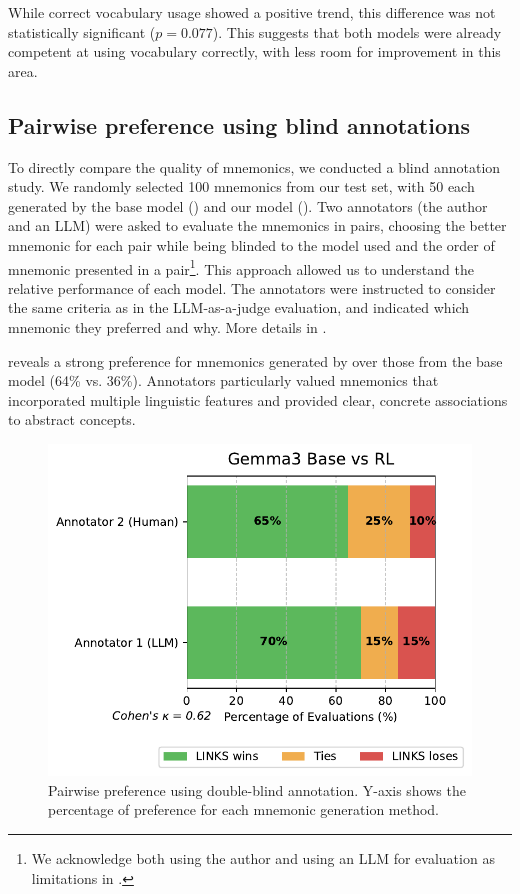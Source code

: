 While correct vocabulary usage showed a positive trend, this difference was not statistically significant ($p = 0.077$). This suggests that both models were already competent at using vocabulary correctly, with less room for improvement in this area.

\subsection{Pairwise preference using blind annotations} \label{sec:pairwise-preference}

To directly compare the quality of mnemonics, we conducted a blind annotation study. We randomly selected 100 mnemonics from our test set, with 50 each generated by the base model (\studentmodel) and our model (\linksys). Two annotators (the author and an LLM) were asked to evaluate the mnemonics in pairs, choosing the better mnemonic for each pair while being blinded to the model used and the order of mnemonic presented in a pair\footnote{We acknowledge both using the author and using an LLM for evaluation as limitations in .}. This approach allowed us to understand the relative performance of each model. The annotators were instructed to consider the same criteria as in the LLM-as-a-judge evaluation, and indicated which mnemonic they preferred and why. More details in .

 reveals a strong preference for mnemonics generated by \linksys over those from the base model (64\% vs. 36\%). Annotators particularly valued mnemonics that incorporated multiple linguistic features and provided clear, concrete associations to abstract concepts.

\begin{figure}[htb]
  \centering
  \includegraphics[width=\linewidth]{figures/model_comparison.pdf}
  \caption{Pairwise preference using double-blind annotation. Y-axis shows the percentage of preference for each mnemonic generation method.}
  \label{fig:pairwise-preference}
\end{figure}
